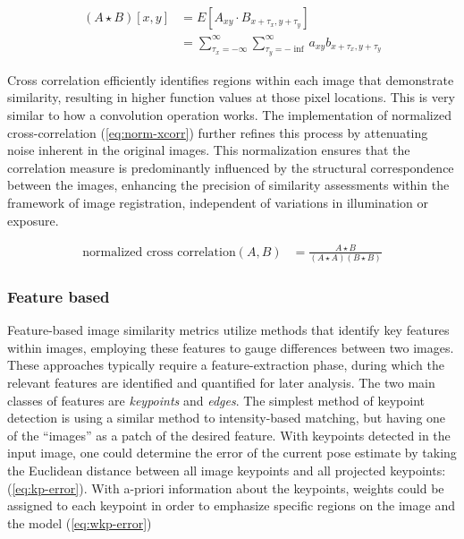 \begin{equation}
    \begin{aligned}
        (A \star B)[x,y] &= E[A_{xy} \cdot B_{x + \tau_x,y+\tau_y}] \\
        &= \sum_{\tau_x=-\infty}^{\infty}\sum_{\tau_y=-\inf}^{\infty}a_{xy}b_{x + \tau_x,y + \tau_y}
    \end{aligned}
    \label{eq:xcorr}
\end{equation}

Cross correlation efficiently identifies regions within each image that demonstrate similarity, resulting in higher function values at those pixel locations.
This is very similar to how a convolution operation works.
The implementation of normalized cross-correlation (\cref{eq:norm-xcorr}) further refines this process by attenuating noise inherent in the original images.
This normalization ensures that the correlation measure is predominantly influenced by the structural correspondence between the images, enhancing the precision of similarity assessments within the framework of image registration, independent of variations in illumination or exposure.

\begin{equation}
    \begin{aligned}
        \text{normalized cross correlation}(A,B) &= \frac{A \star B}{(A \star A)(B \star B)}
    \end{aligned}\label{eq:norm-xcorr}
\end{equation}

\subsubsection{Feature based}
\label{sec:img-sim-feature}
Feature-based image similarity metrics utilize methods that identify key features within images, employing these features to gauge differences between two images.
These approaches typically require a feature-extraction phase, during which the relevant features are identified and quantified for later analysis.
The two main classes of features are \emph{keypoints} and \emph{edges}.
The simplest method of keypoint detection is using a similar method to intensity-based matching, but having one of the ``images'' as a patch of the desired feature.
With keypoints detected in the input image, one could determine the error of the current pose estimate by taking the Euclidean distance between all image keypoints and all projected keypoints: \cite{burtonAutomaticTrackingHealthy2021} (\cref{eq:kp-error}).
With a-priori information about the keypoints, weights could be assigned to each keypoint in order to emphasize specific regions on the image and the model (\cref{eq:wkp-error})

